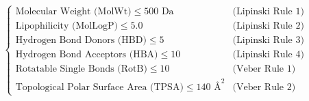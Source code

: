 \documentclass[11pt,a4paper]{article}
\begin{document}
\begin{equation}
\label{eq:lipinski_veber}
\begin{cases}
\text{Molecular Weight (MolWt)} \le 500\text{ Da} & \text{(Lipinski Rule 1)} \\
\text{Lipophilicity (MolLogP)} \le 5.0 & \text{(Lipinski Rule 2)} \\
\text{Hydrogen Bond Donors (HBD)} \le 5 & \text{(Lipinski Rule 3)} \\
\text{Hydrogen Bond Acceptors (HBA)} \le 10 & \text{(Lipinski Rule 4)} \\
\text{Rotatable Single Bonds (RotB)} \le 10 & \text{(Veber Rule 1)} \\
\text{Topological Polar Surface Area (TPSA)} \le 140\text{ \AA}^2 & \text{(Veber Rule 2)}
\end{cases}
\end{equation}
\end{document}
